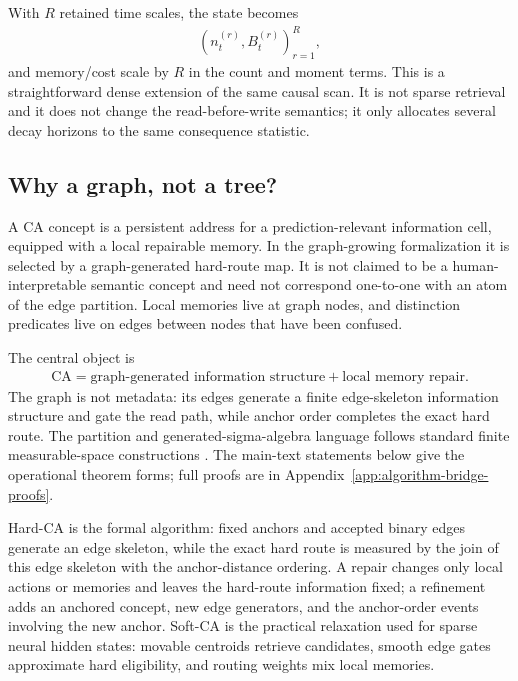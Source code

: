 With $R$ retained time scales, the state becomes
\begin{align*}
(n_t^{(r)},B_t^{(r)})_{r=1}^{R},
\end{align*}
and memory/cost scale by $R$ in the count and moment terms. This is a straightforward dense extension of the same causal scan. It is not sparse retrieval and it does not change the read-before-write semantics; it only allocates several decay horizons to the same consequence statistic.

\subsection{Why a graph, not a tree?}

\begin{definition}[CA concept]
\label{def:dgm-concept}
A CA concept is a persistent address for a prediction-relevant information cell, equipped with a local repairable memory. In the graph-growing formalization it is selected by a graph-generated hard-route map. It is not claimed to be a human-interpretable semantic concept and need not correspond one-to-one with an atom of the edge partition. Local memories live at graph nodes, and distinction predicates live on edges between nodes that have been confused.
\end{definition}

The central object is
\begin{align*}
\text{CA}=\text{graph-generated information structure}+\text{local memory repair}.
\end{align*}
The graph is not metadata: its edges generate a finite edge-skeleton information structure and gate the read path, while anchor order completes the exact hard route. The partition and generated-sigma-algebra language follows standard finite measurable-space constructions \citep{billingsley1995probability,kallenberg2002foundations}. The main-text statements below give the operational theorem forms; full proofs are in Appendix~\ref{app:algorithm-bridge-proofs}.

\begin{definition}
\label{def:hard-soft-dgm}
Hard-CA is the formal algorithm: fixed anchors and accepted binary edges generate an edge skeleton, while the exact hard route is measured by the join of this edge skeleton with the anchor-distance ordering. A repair changes only local actions or memories and leaves the hard-route information fixed; a refinement adds an anchored concept, new edge generators, and the anchor-order events involving the new anchor. Soft-CA is the practical relaxation used for sparse neural hidden states: movable centroids retrieve candidates, smooth edge gates approximate hard eligibility, and routing weights mix local memories.
\end{definition}

